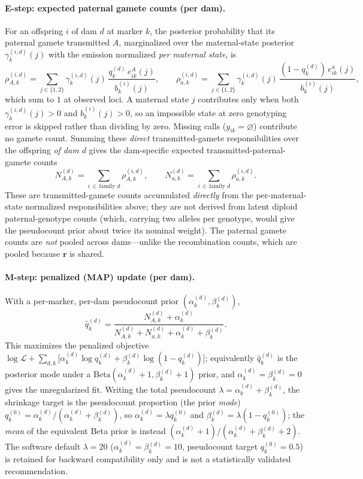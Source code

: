 \documentclass[11pt]{article}
\begin{document}
\paragraph{E-step: expected paternal gamete counts (per dam).}
For an offspring \(i\) of dam \(d\) at marker \(k\), the posterior probability that its paternal
gamete transmitted \(A\), marginalized over the maternal-state posterior \(\gamma_k^{(i,d)}(j)\)
with the emission normalized \emph{per maternal state}, is
\[
\rho_{A,k}^{(i,d)}=\sum_{j\in\{1,2\}}\gamma_k^{(i,d)}(j)\,
\frac{q_k^{(d)}\,e^{A}_{ik}(j)}{b_k^{(i)}(j)},
\qquad
\rho_{a,k}^{(i,d)}=\sum_{j\in\{1,2\}}\gamma_k^{(i,d)}(j)\,
\frac{(1-q_k^{(d)})\,e^{a}_{ik}(j)}{b_k^{(i)}(j)},
\]
which sum to \(1\) at observed loci. A maternal state \(j\) contributes only when both
\(\gamma_k^{(i,d)}(j)>0\) and \(b_k^{(i)}(j)>0\), so an impossible state at zero genotyping error is
skipped rather than dividing by zero. Missing calls (\(y_{ik}=\varnothing\)) contribute no gamete
count. Summing these \emph{direct} transmitted-gamete responsibilities over the offspring
\emph{of dam \(d\)} gives the dam-specific expected transmitted-paternal-gamete counts
\[
N_{A,k}^{(d)}=\sum_{i\,\in\,\text{family }d}\rho_{A,k}^{(i,d)},\qquad
N_{a,k}^{(d)}=\sum_{i\,\in\,\text{family }d}\rho_{a,k}^{(i,d)}.
\]
These are transmitted-gamete counts accumulated \emph{directly} from the per-maternal-state
normalized responsibilities above; they are not derived from latent diploid paternal-genotype
counts (which, carrying two alleles per genotype, would give the pseudocount prior about twice its
nominal weight). The paternal gamete counts are \emph{not} pooled across dams---unlike the
recombination counts, which are pooled because \(\mathbf r\) is shared.

\paragraph{M-step: penalized (MAP) update (per dam).}
With a per-marker, per-dam pseudocount prior \((\alpha_k^{(d)},\beta_k^{(d)})\),
\[
\hat q_k^{(d)}=\frac{N_{A,k}^{(d)}+\alpha_k^{(d)}}
{N_{A,k}^{(d)}+N_{a,k}^{(d)}+\alpha_k^{(d)}+\beta_k^{(d)}}.
\]
This maximizes the penalized objective
\(\log\mathcal{L}+\sum_{d,k}\bigl[\alpha_k^{(d)}\log q_k^{(d)}+\beta_k^{(d)}\log(1-q_k^{(d)})\bigr]\);
equivalently \(\hat q_k^{(d)}\) is the posterior mode under a
\(\mathrm{Beta}(\alpha_k^{(d)}+1,\beta_k^{(d)}+1)\) prior, and \(\alpha_k^{(d)}=\beta_k^{(d)}=0\)
gives the unregularized fit. Writing the total pseudocount \(\lambda=\alpha_k^{(d)}+\beta_k^{(d)}\),
the shrinkage target is the pseudocount proportion (the prior \emph{mode})
\(q^{(0)}_k=\alpha_k^{(d)}/(\alpha_k^{(d)}+\beta_k^{(d)})\), so \(\alpha_k^{(d)}=\lambda q^{(0)}_k\)
and \(\beta_k^{(d)}=\lambda(1-q^{(0)}_k)\); the \emph{mean} of the equivalent Beta prior is instead
\((\alpha_k^{(d)}+1)/(\alpha_k^{(d)}+\beta_k^{(d)}+2)\). The software default \(\lambda=20\)
(\(\alpha_k^{(d)}=\beta_k^{(d)}=10\), pseudocount target \(q^{(0)}_k=0.5\)) is retained for backward
compatibility only and is not a statistically validated recommendation.
\end{document}
